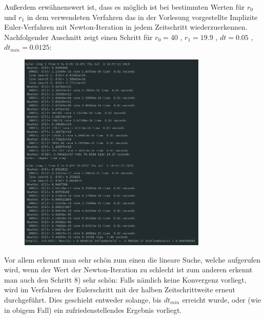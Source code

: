 Außerdem erwähnenswert ist, dass es möglich ist bei bestimmten Werten für $r_0$ und $r_1$ in dem verwendeten Verfahren das in der Vorlesung vorgestellte Implizite Euler-Verfahren mit Newton-Iteration in jedem Zeitschritt wiederzuerkennen.
Nachfolgender Auschnitt zeigt einen Schritt für $r_0 = 40$ , $r_1=19.9$ , $dt = 0.05$ , $dt_{min}=0.0125$:
\begin{figure}[H]
	\centering
	\includegraphics[width=0.80\textwidth]{../Aufgabe30/algorithmus.png}
\end{figure}
Vor allem erkennt man sehr schön zum einen die lineare Suche, welche aufgerufen wird, wenn der Wert der Newton-Iteration zu schlecht ist zum anderen erkennt man auch den Schritt 8) sehr schön: 
Falls nämlich keine Konvergenz vorliegt, wird im Verfahren der Eulerschritt mit der halben Zeitschrittweite erneut durchgeführt. Dies geschieht entweder solange, bis $dt_{min}$ erreicht wurde, oder (wie in obigem Fall) ein zufriedenstellendes Ergebnis vorliegt.
